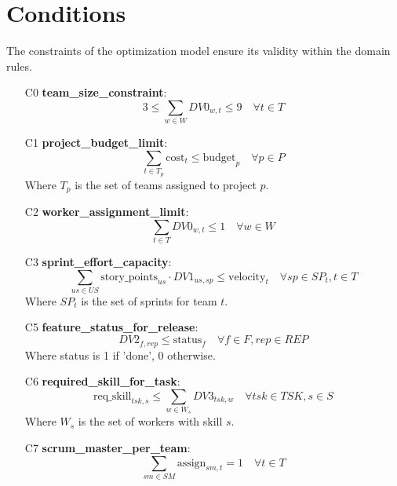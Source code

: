 \documentclass{article}
\begin{document}
\section{Conditions}
The constraints of the optimization model ensure its validity within the domain rules.
\begin{itemize}
    \item [C0] \textbf{team\_size\_constraint}:
    $$ 3 \le \sum_{w \in W} DV0_{w,t} \le 9 \quad \forall t \in T $$
    \item [C1] \textbf{project\_budget\_limit}:
    $$ \sum_{t \in T_p} \text{cost}_t \le \text{budget}_p \quad \forall p \in P $$
    Where $T_p$ is the set of teams assigned to project $p$.
    \item [C2] \textbf{worker\_assignment\_limit}:
    $$ \sum_{t \in T} DV0_{w,t} \le 1 \quad \forall w \in W $$
    \item [C3] \textbf{sprint\_effort\_capacity}:
    $$ \sum_{us \in US} \text{story\_points}_{us} \cdot DV1_{us,sp} \le \text{velocity}_t \quad \forall sp \in SP_t, t \in T $$
    Where $SP_t$ is the set of sprints for team $t$.
    \item [C5] \textbf{feature\_status\_for\_release}:
    $$ DV2_{f,rep} \le \text{status}_f \quad \forall f \in F, rep \in REP $$
    Where status is 1 if 'done', 0 otherwise.
    \item [C6] \textbf{required\_skill\_for\_task}:
    $$ \text{req\_skill}_{tsk,s} \le \sum_{w \in W_s} DV3_{tsk,w} \quad \forall tsk \in TSK, s \in S $$
    Where $W_s$ is the set of workers with skill $s$.
    \item [C7] \textbf{scrum\_master\_per\_team}:
    $$ \sum_{sm \in SM} \text{assign}_{sm,t} = 1 \quad \forall t \in T $$
\end{itemize}
\end{document}
